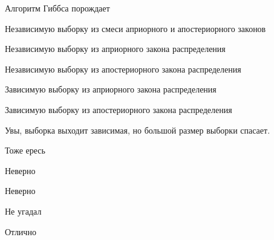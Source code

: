 
\begin{question}
Алгоритм Гиббса порождает
\begin{answerlist}
  \item Независимую выборку из смеси априорного и апостериорного законов
  \item Независимую выборку из априорного закона распределения
  \item Независимую выборку из апостериорного закона распределения
  \item Зависимую выборку из априорного закона распределения
  \item Зависимую выборку из апостериорного закона распределения
\end{answerlist}
\end{question}

\begin{solution}
Увы, выборка выходит зависимая, но большой размер выборки спасает.
\begin{answerlist}
  \item Тоже ересь
  \item Неверно
  \item Неверно
  \item Не угадал
  \item Отлично
\end{answerlist}
\end{solution}

